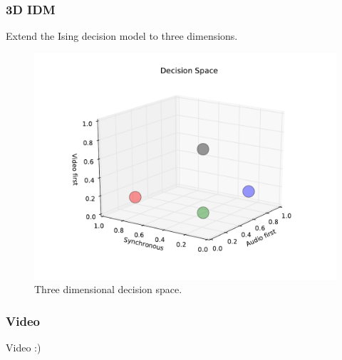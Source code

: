 \documentclass[xcolor={fixpdftex,hyperref,x11names},10pt,pdftex,hyperref={pdftex}]{beamer}
\begin{document}



\begin{frame}
  \frametitle{3D IDM}
  Extend the Ising decision model to three dimensions.

  \begin{figure}[h]
    \centering
    \includegraphics[width=\textwidth]{./figs/decision_space_3d.pdf}
    \caption{Three dimensional decision space.}
    \label{fig:3dspace}
  \end{figure}
\end{frame}

\begin{frame}
  \frametitle{Video}
  Video :)
\end{frame}
\end{document}
